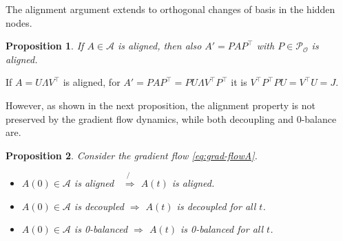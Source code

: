\documentclass{article}
\makeatletter
\renewenvironment{proof}[1][\proofname]{
  \par\pushQED{\qed}\normalfont
  \topsep6\p@\@plus6\p@\relax
  \trivlist\item[\hskip\labelsep\bfseries#1\@addpunct{.}]
  \ignorespaces
}{
  \popQED\endtrivlist\@endpefalse
}
\newtheorem{proposition}{Proposition}
\newcommand{\1}{\mathds{1}}
\newcommand{\bite}{\begin{itemize}}
\newcommand{\eite}{\end{itemize}}
\makeatother
\begin{document}
The alignment argument extends to orthogonal changes of basis in the hidden nodes. 
\begin{proposition}
If $ A\in \mathcal{A} $ is aligned, then also $ A' = P A P^\top $ with $ P \in \mathcal{P_O}$ is aligned.
\end{proposition}
\begin{proof}
   If $ A= U \Lambda V^\top  $ is aligned, for $ A' = P A P^\top = P U \Lambda V^\top P^\top $ it is $ V^\top P^\top P U = V^\top U = J $.
\end{proof}
However, as shown in the next proposition, the alignment property is not preserved by the gradient flow dynamics, while both decoupling and 0-balance are.
\begin{proposition}
\label{prop:special-impl}
Consider the gradient flow \eqref{eq:grad-flowA}. 
\bite
\item $ A(0) \in \mathcal{A} $ is aligned $\;  \;\not{\!\!\!\!\Longrightarrow}$ $  A(t) $ is aligned.
\item $ A(0) \in \mathcal{A} $ is decoupled $ \Longrightarrow $ $ A(t) $ is decoupled for all $ t$. 
\item $ A(0) \in \mathcal{A} $ is 0-balanced $ \Longrightarrow $ $ A(t) $ is 0-balanced for all $ t$. 
\eite
\end{proposition}
\end{document}
